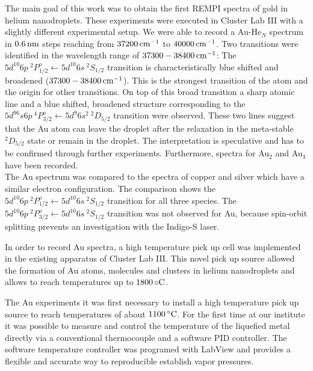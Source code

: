 \documentclass[parskip,12pt,headsepline,a4paper] {scrbook}
\begin{document}
The main goal of this work was to obtain the first REMPI spectra of gold in helium nanodroplets. These experiments were executed in Cluster Lab III with a slightly different experimental setup. We were able to record a Au-He$_N$ spectrum in $\unit[0.6]{nm}$ steps reaching from $\unit[37200]{cm^{-1}}$ to $\unit[40000]{cm^{-1}}$. Two transitions were identified in the wavelength range of $\unit[37300 - 38400]{cm^{-1}}$: The $5d^{10}6p \ ^2P^o_{1/2} \leftarrow 5d^{10}6s \ ^2S_{1/2}$ transition is characteristically blue shifted and broadened ($\unit[37300 - 38400]{cm^{-1}}$). This is the strongest transition of the atom and the origin for other transitions. On top of this broad transition a sharp atomic line and a blue shifted, broadened structure corresponding to the $5d^96s6p \ ^4P^o_{3/2} \leftarrow 5d^{9} 6s^{2} \ ^2D_{5/2}$ transition were observed. These two lines suggest that the Au atom can leave the droplet after the relaxation in the meta-stable $^2D_{5/2}$ state or remain in the droplet. The interpretation is speculative and has to be confirmed through further experiments. Furthermore, spectra for Au$_2$ and Au$_3$ have been recorded. \\
The Au spectrum was compared to the spectra of copper and silver which have a similar electron configuration. The comparison shows the $5d^{10}6p \ ^2P^o_{1/2} \leftarrow 5d^{10}6s \ ^2S_{1/2}$ transition for all three species. The $5d^{10}6p \ ^2P^o_{3/2} \leftarrow 5d^{10}6s \ ^2S_{1/2}$ transition was not observed for Au, because spin-orbit splitting prevents an investigation with the Indigo-S laser.

In order to record Au spectra, a high temperature pick up cell was implemented in the existing apparatus of Cluster Lab III. This novel pick up source allowed the formation of Au atoms, molecules and clusters in helium nanodroplets and allows to reach temperatures up to $\unit[1800]{\circ C}$.

The Au experiments it was first necessary to install a high temperature pick up source to reach temperatures of about $\unit[1100]{^\circ C}$. For the first time at our institute it was possible to measure and control the temperature of the liquefied metal directly via a conventional thermocouple and a software PID controller. The software temperature controller was programed with LabView and provides a flexible and accurate way to reproducible establish vapor pressures.


\appendix
\end{document}
